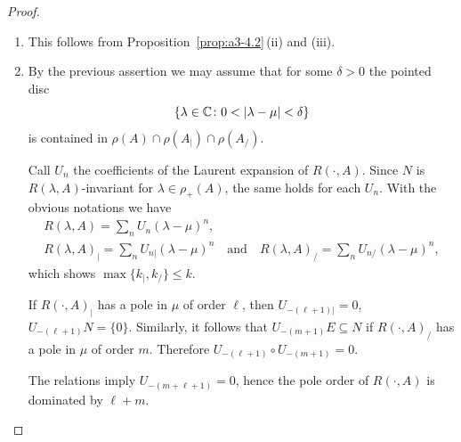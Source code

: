 \begin{proof}
\begin{enumerate}[\upshape (i), wide, labelindent=.25em]
\item 
This follows from Proposition~\ref{prop:a3-4.2}\,(ii) and (iii).

\item 
By the previous assertion we may assume that for some $\delta > 0$ the pointed disc
\[
\{\lambda \in \mathbb{C} \colon 0 < |\lambda-\mu| < \delta\}
\]
is contained in $\rho(A) \cap \rho(A_{|}) \cap \rho(A_{/})$.

Call $U_{n}$ the coefficients of the Laurent expansion of\/ $R(\cdot,A)$.
Since $N$ is $R(\lambda,A)$-invariant for $\lambda \in \rho_{+}(A)$, the same holds for each $U_{n}$.
With the obvious notations we have
\begin{gather*}
R(\lambda,A) = \sum_{n} U_{n}(\lambda-\mu)^{n}, \\
R(\lambda,A)_{|} = \sum_{n} U_{n|}(\lambda-\mu)^{n} \quad \text{and} \quad R(\lambda,A)_{/} = \sum_{n} U_{n/}(\lambda-\mu)^{n},
\end{gather*}
which shows $\max\{k_{|},k_{/}\} \leq k$.

If\/ $R(\cdot,A)_{|}$ has a pole in $\mu$ of order $\ell$, then $U_{-(\ell+1)|} = 0$, \ie $U_{-(\ell+1)}N = \{0\}$.
Similarly, it follows that $U_{-(m+1)}E \subseteq N$ if\/ $R(\cdot,A)_{/}$ has a pole in $\mu$ of order $m$.
Therefore $U_{-(\ell+1)} \circ U_{-(m+1)} = 0$.

The relations  imply $U_{-(m+\ell+1)} = 0$, hence the pole order of\/ $R(\cdot,A)$ is dominated by $\ell + m$.
\qedhere
\end{enumerate}
\end{proof}
